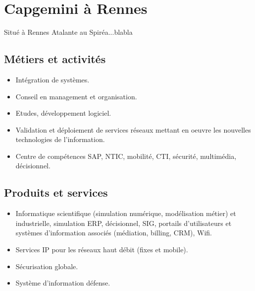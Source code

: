 \section{Capgemini à Rennes}
Situé à Rennes Atalante au Spiréa...blabla
\subsection{Métiers et activités}
\begin{itemize}
\item Intégration de systèmes.
\item Conseil en management et organisation.
\item Etudes, développement logiciel.
\item Validation et déploiement de services réseaux mettant en oeuvre les nouvelles technologies de l'information.
\item Centre de compétences SAP, NTIC, mobilité, CTI, sécurité, multimédia, décisionnel.
\end{itemize}
\subsection{Produits et services}
\begin{itemize}
\item Informatique scientifique (simulation numérique, modélisation métier) et industrielle, simulation ERP, décisionnel, SIG, portails d'utilisateurs et systèmes d'information associés (médiation, billing, CRM), Wifi.
\item Services IP pour les réseaux haut débit (fixes et mobile).
\item Sécurisation globale.
\item Système d'information défense.
\end{itemize}
